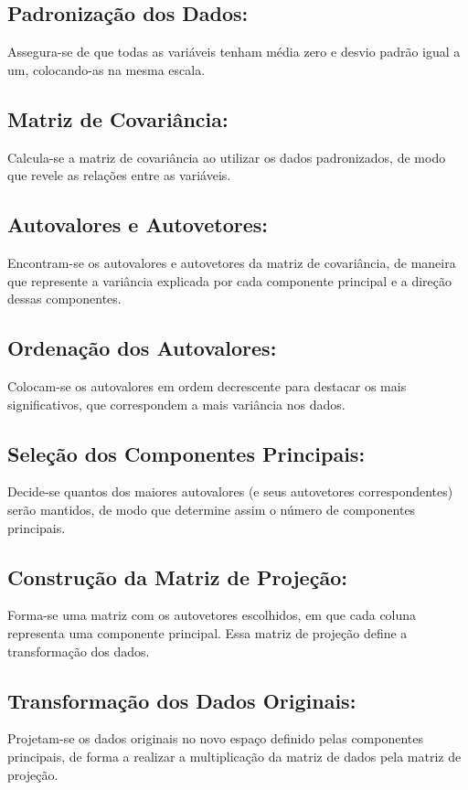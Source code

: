 \documentclass[a4paper,12pt]{article}
\begin{document}
\subsection{Padronização dos Dados:}

Assegura-se de que todas as variáveis tenham média zero e desvio padrão igual a um, colocando-as na mesma escala.
\subsection{Matriz de Covariância:}

Calcula-se a matriz de covariância ao utilizar os dados padronizados, de modo que revele as relações entre as variáveis.
\subsection{Autovalores e Autovetores:}

Encontram-se os autovalores e autovetores da matriz de covariância, de maneira que represente a variância explicada por cada componente principal e a direção dessas componentes.
\subsection{Ordenação dos Autovalores:}

Colocam-se os autovalores em ordem decrescente para destacar os mais significativos, que correspondem a mais variância nos dados.
\subsection{Seleção dos Componentes Principais:}

Decide-se quantos dos maiores autovalores (e seus autovetores correspondentes) serão mantidos, de modo que determine assim o número de componentes principais.
\subsection{Construção da Matriz de Projeção:}

Forma-se uma matriz com os autovetores escolhidos, em que cada coluna representa uma componente principal. Essa matriz de projeção define a transformação dos dados.
\subsection{Transformação dos Dados Originais:}

Projetam-se os dados originais no novo espaço definido pelas componentes principais, de forma a realizar a multiplicação da matriz de dados pela matriz de projeção.
\end{document}
